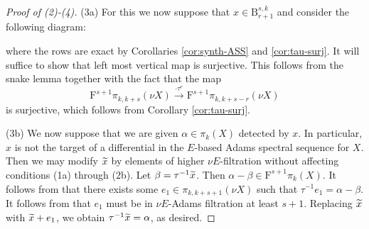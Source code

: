 \begin{proof}[Proof of (2)-(4)]
    (3a) For this we now suppose that $x \in \mathrm{B}_{r+1}^{s,k}$ and consider the following diagram:
    \begin{center}
    \end{center}
    where the rows are exact by Corollaries \ref{cor:synth-ASS} and \ref{cor:tau-surj}.
    It will suffice to show that left most vertical map is surjective.
    This follows from the snake lemma together with the fact that the map
    $$ \mathrm{F}^{s+1}\pi_{k,k+s}(\nu X) \xrightarrow{\cdot \tau^r} \mathrm{F}^{s+1}\pi_{k,k+s-r}(\nu X) $$
    is surjective, which follows from Corollary \ref{cor:tau-surj}.
    
    (3b) We now suppose that we are given $\alpha \in \pi_k (X)$ detected by $x$. In particular, $x$ is not the target of a differential in the $E$-based Adams spectral sequence for $X$. Then we may modify $\wt{x}$ by elements of higher $\nu E$-filtration without affecting conditions (1a) through (2b). Let $\beta = \tau^{-1} \wt{x}$. Then $\alpha - \beta \in \mathrm{F}^{s+1} \pi_k (X)$. It follows from  that there exists some $e_1 \in \pi_{k,k+s+1} (\nu X)$ such that $\tau^{-1} e_1 = \alpha-\beta$. It follows from  that $e_1$ must be in $\nu E$-Adams filtration at least $s+1$. Replacing $\wt{x}$ with $\wt{x} + e_1$, we obtain $\tau^{-1} \wt{x} = \alpha$, as desired.


\end{proof}
